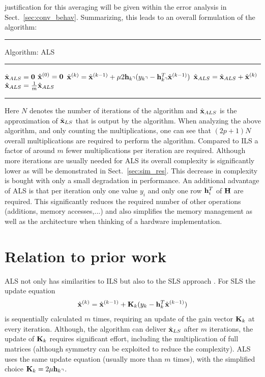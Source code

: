 \documentclass{article}
\begin{document}
justification for this averaging will be given within the error analysis 
in Sect.~\ref{sec:conv_behav}. 
Summarizing, this leads to an overall formulation of the algorithm: \\ 
\clearpage
{}\smallskipamount
\noindent \rule{\columnwidth}{.4pt}
\smallskipamount
\noindent Algorithm: ALS\\
\smallskipamount
\noindent \rule{\columnwidth}{.4pt}
\begin{algorithmic}                    
\State $\hat{\bf x}_{ALS} = {\bf 0}$
\State $\hat{\bf x}^{(0)} = {\bf 0}$
\State $\hat{\bf x}^{(k)} = \hat{\bf x}^{(k-1)} + \mu 2 {\bf h}_{k\urcorner} ({y_{k\urcorner}} - {\bf h}_{k\urcorner}^T \hat{\bf x}^{(k-1)})$
\State $\hat{\bf x}_{ALS} = \hat{\bf x}_{ALS} + \hat{\bf x}^{(k)}$
\EndIf
\EndFor
\State $\hat{\bf x}_{ALS} = \frac{1}{m} \hat{\bf x}_{ALS}$
\end{algorithmic}
\smallskipamount
\noindent \rule{\columnwidth}{.4pt}
Here $N$ denotes the number of iterations of the algorithm and 
$\hat{\bf x}_{ALS}$ is the approximation of $\hat{\bf x}_{LS}$ 
that is output by the algorithm.
When analyzing the above algorithm, and only counting the multiplications, one can 
see that $(2p+1)N$ overall multiplications are required to perform the algorithm. 
Compared to ILS a factor of around $m$ fewer multiplications per 
iteration are required. 
Although more iterations are usually needed for ALS  
its overall complexity is significantly lower
as will be demonstrated in Sect.~\ref{sec:sim_res}.
This decrease in complexity is bought with only a 
small degradation in performance. An additional advantage of ALS is 
that per iteration only one value $y_i$ and only one row 
${\bf h}_i^T$ of $\bf H$ are required. 
This significantly 
reduces the required number of other operations (additions,
memory accesses,...) and also simplifies the memory management as well 
as the architecture when thinking of a hardware implementation.
\section{Relation to prior work}  
\label{sec:prior} 
ALS not only has similarities to ILS but also to the SLS approach \cite{kay}.
For SLS the update equation
\begin{align}
\hat{\bf x}^{(k)} = \hat{\bf x}^{(k-1)} + {\bf K}_{k} ({y_{k}} - {\bf h}_{k}^T \hat{\bf x}^{(k-1)})
\end{align}
is sequentially calculated $m$ times, requiring an update of the gain vector 
${\bf K}_{k}$ at every iteration.
Although, the algorithm can deliver $\hat{\bf x}_{LS}$ after $m$ iterations, 
the update 
of ${\bf K}_{k}$ requires significant effort, including the multiplication of full 
matrices (although symmetry can be exploited
to reduce the complexity). ALS uses the same update equation 
(usually more than $m$ times),
with the simplified choice ${\bf K}_{k} = 2 \mu {\bf h}_{k\urcorner}$.
\end{document}
